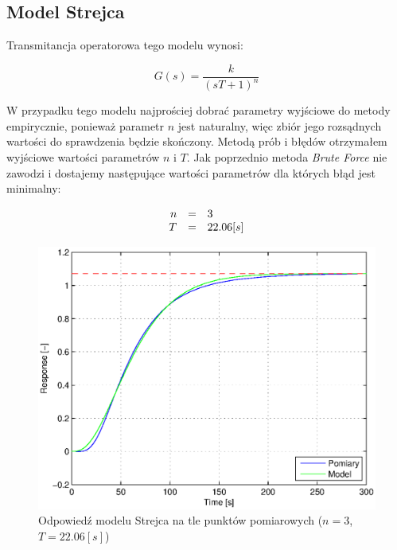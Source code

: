 \documentclass[12pt]{article}
\begin{document}
\newpage

\subsection{Model Strejca}

Transmitancja operatorowa tego modelu wynosi:

\begin{equation}
	G(s)=\frac{k}{(sT+1)^n}
	\label{equ:transtrejc}
\end{equation}

W przypadku tego modelu najprościej dobrać parametry wyjściowe do metody
empirycznie, ponieważ parametr $n$ jest naturalny, więc
zbiór jego rozsądnych wartości do sprawdzenia będzie skończony.
Metodą prób i błędów otrzymałem wyjściowe wartości parametrów $n$ i $T$. Jak
poprzednio metoda \textit{Brute Force} nie zawodzi i dostajemy
następujące wartości parametrów dla których błąd jest minimalny:

\begin{equation*}
	\begin{array}{r c l}
		n&=&3 \\
		T&=&22.06[s]
	\end{array}
\end{equation*}

\newpage

\begin{figure}[!htp]
	\begin{center}
		\includegraphics[width=13cm]{../res/img/step31.eps}
	\end{center} 
	\caption{Odpowiedź modelu Strejca na tle punktów
	pomiarowych ($n=3$, $T=22.06[s]$)}
\end{figure}
\end{document}

